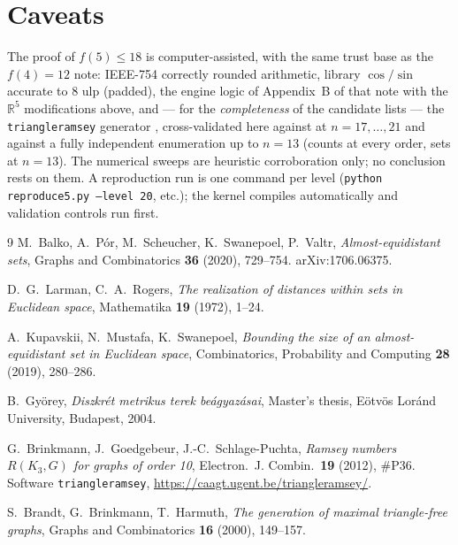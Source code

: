 \documentclass[11pt]{article}
\newcommand{\R}{\mathbb{R}}
\begin{document}
\section*{Caveats}

The proof of $f(5)\le18$ is computer-assisted, with the same trust base as
the $f(4)=12$ note: IEEE-754 correctly rounded arithmetic, library
$\cos/\sin$ accurate to $8$ ulp (padded), the engine logic of Appendix~B
of that note with the $\R^5$ modifications above, and --- for the
\emph{completeness} of the candidate lists --- the \texttt{triangleramsey}
generator \cite{BGS}, cross-validated here against \cite{BPSSV} at
$n=17,\dots,21$ and against a fully independent enumeration up to $n=13$
(counts at every order, sets at $n=13$). The numerical sweeps are
heuristic corroboration only; no conclusion rests on them. A reproduction
run is one command per level (\texttt{python reproduce5.py --level 20},
etc.); the kernel compiles automatically and validation controls run
first.

\begin{thebibliography}{9}\small
{} M.~Balko, A.~P\'or, M.~Scheucher, K.~Swanepoel, P.~Valtr,
\emph{Almost-equidistant sets}, Graphs and Combinatorics \textbf{36}
(2020), 729--754. arXiv:1706.06375.

 D.~G.~Larman, C.~A.~Rogers, \emph{The realization of
distances within sets in Euclidean space}, Mathematika \textbf{19} (1972),
1--24.

 A.~Kupavskii, N.~Mustafa, K.~Swanepoel, \emph{Bounding the
size of an almost-equidistant set in Euclidean space}, Combinatorics,
Probability and Computing \textbf{28} (2019), 280--286.

 B.~Gy\"orey, \emph{Diszkr\'et metrikus terek
be\'agyaz\'asai}, Master's thesis, E\"otv\"os Lor\'and University,
Budapest, 2004.

 G.~Brinkmann, J.~Goedgebeur, J.-C.~Schlage-Puchta,
\emph{Ramsey numbers $R(K_3,G)$ for graphs of order 10}, Electron.\ J.
Combin.\ \textbf{19} (2012), \#P36. Software \texttt{triangleramsey},
\url{https://caagt.ugent.be/triangleramsey/}.

 S.~Brandt, G.~Brinkmann, T.~Harmuth, \emph{The generation of
maximal triangle-free graphs}, Graphs and Combinatorics \textbf{16}
(2000), 149--157.
\end{thebibliography}
\end{document}

